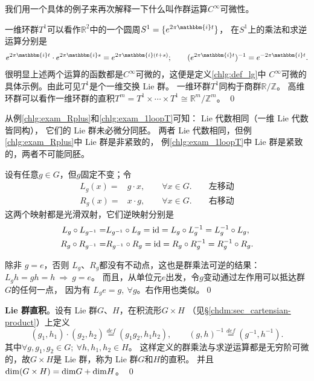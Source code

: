 我们用一个具体的例子来再次解释一下什么叫作群运算$C^\infty$可微性。
\begin{example}\label{chlg:exam_1loopT}
    一维环群$T^1$可以看作$\mathbb{R}^2$中的一个圆周$S^1=\{e^{2\pi \mathbbm{i}t} \}$，
    在$S^1$上的乘法和求逆运算分别是
    \begin{align*}
        e^{2\pi \mathbbm{i}t} \cdot e^{2\pi \mathbbm{i}s} = e^{2\pi \mathbbm{i}(t+s)}; \qquad
        (e^{2\pi \mathbbm{i}t})^{-1} = e^{-2\pi \mathbbm{i}t} .
    \end{align*}
    很明显上述两个运算的函数都是$C^\infty$可微的，这便是定义\ref{chlg:def_lg}中
    $C^\infty$可微的具体示例。由此可见$T^1$是个一维交换 Lie 群。
    一维环群$T^1$同构于商群$\mathbb{R}/\mathbb{Z}$。 %
    高维环群可以看作一维环群的直积$T^m=T^1\times \cdots \times T^1 \cong \mathbb{R}^m/\mathbb{Z}^m$。
    \qed
\end{example}

从例\ref{chlg:exam_Rplus}和\ref{chlg:exam_1loopT}可知： Lie 代数相同（一维 Lie 代数皆同构），
它们的 Lie 群未必微分同胚。
两者 Lie 代数相同，但例\ref{chlg:exam_Rplus}中 Lie 群是非紧致的，
例\ref{chlg:exam_1loopT}中 Lie 群是紧致的，两者不可能同胚。

  
\begin{example}
设有任意$g\in G$，但$g$固定不变；令
\begin{align}
    L_g(x)=& g\cdot x, \qquad \forall x \in G. \qquad {\textbf{左移动}} \\
    R_g(x)=& x\cdot g, \qquad \forall x \in G. \qquad {\textbf{右移动}}
\end{align}
这两个映射都是光滑双射，它们逆映射分别是
\begin{align}
    L_g \circ L_{g^{-1}} = & L_{g^{-1}} \circ L_g = {\rm id} = L_g \circ L_{g}^{-1} = L_{g}^{-1} \circ L_g ,  \\
    R_g \circ R_{g^{-1}} = & R_{g^{-1}} \circ R_g = {\rm id} = R_g \circ R_{g}^{-1} = R_{g}^{-1} \circ R_g .
\end{align}

除非 $g=e$，否则 $L_g$、$R_g$都没有不动点，这也是群乘法可逆的结果： 
$L_g h = gh = h \ \Rightarrow \ g=e$。
而且，从单位元$e$出发，令$g$变动通过左作用可以抵达群$G$的任何一点，
因为有 $L_g e = g,\ \forall g$。右作用也类似。\qed
\end{example}

\begin{example}\label{chlg:exam_dir-prod}
    \textbf{ Lie 群直积}。设有 Lie 群$G$、$H$，在积流形$G\times H$
    （见\S\ref{chdm:sec_cartensian-product}）上定义
    \begin{equation}
        (g_1,h_1)\cdot(g_2,h_2)\overset{def}{=}(g_1 g_2, h_1h_2), \qquad
        (g,h)^{-1}\overset{def}{=}(g^{-1},h^{-1}).
    \end{equation}
    其中$\forall g,g_1,g_2\in G;\ \forall h,h_1,h_2\in H$。
    这样定义的群乘法与求逆运算都是无穷阶可微的，故$G\times H$是 Lie 群，称为 Lie 群$G$和$H$的直积。
    并且${\rm dim}(G\times H)={\rm dim}G+{\rm dim}H$。 \qed
\end{example}


